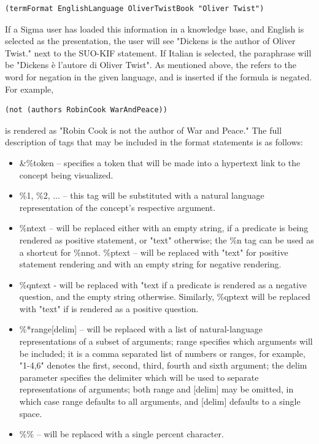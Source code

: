 \documentclass{book}
\begin{document}
\begin{verbatim}
(termFormat EnglishLanguage OliverTwistBook "Oliver Twist")
\end{verbatim}

If a Sigma user has loaded this information in a knowledge base, and English is
selected as the presentation, the user will see "Dickens is the author of Oliver
Twist." next to the SUO-KIF statement.  If Italian is selected, the paraphrase
will be "Dickens è l'autore di Oliver Twist".  As mentioned above, the %
refers to the word for negation in the given language, and is inserted if the
formula is negated.  For example,

\begin{verbatim}
(not (authors RobinCook WarAndPeace))
\end{verbatim}

is rendered as "Robin Cook is not the author of War and Peace." The full
description of tags that may be included in the format statements is as follows:

\begin{itemize}

\item \&\%token – specifies a token that will be made into a hypertext link to
the concept being visualized.

\item \%1, \%2, ... – this tag will be substituted with a natural language
representation of the concept’s respective argument.

\item \%n{text} – will be replaced either with an empty string, if a predicate
is being rendered as positive statement, or "text" otherwise; the \%n tag can be
used as a shortcut for \%n{not}. \%p{text} – will be replaced with "text" for
positive statement rendering and with an empty string for negative rendering.

\item \%qn{text} - will be replaced with "text if a predicate is rendered as a
negative question, and the empty string otherwise. Similarly, \%qp{text} will be
replaced with "text" if is rendered as a positive question.

\item \%*{range}[delim] – will be replaced with a list of natural-language
representations of a subset of arguments; range specifies which arguments will
be included; it is a comma separated list of numbers or ranges, for example,
"1-4,6" denotes the first, second, third, fourth and sixth argument; the
delim parameter specifies the delimiter which will be used to separate
representations of arguments; both {range} and [delim] may be omitted, in which
case {range} defaults to all arguments, and [delim] defaults to a single space.

\item \%\% – will be replaced with a single percent character.
\end{itemize}
\end{document}
